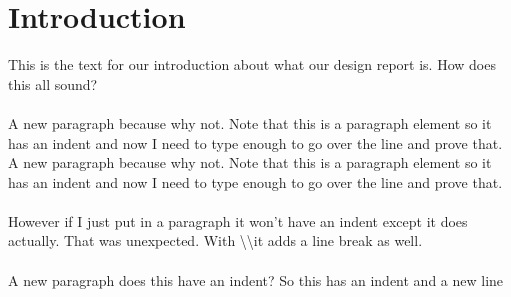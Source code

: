 \section{Introduction}
This is the text for our introduction about what our design report is.
How does this all sound?
\paragraph{}
A new paragraph because why not. Note that this is a paragraph element so it has an indent and now I need to type enough to go over the line and prove that. A new paragraph because why not. Note that this is a paragraph element so it has an indent and now I need to type enough to go over the line and prove that.

\paragraph{}
However if I just put in a paragraph it won't have an indent except it does actually. That was unexpected. With \textbackslash \textbackslash  \space it adds a line break as well.
\paragraph{}
A new paragraph does this have an indent? So this has an indent and a new line